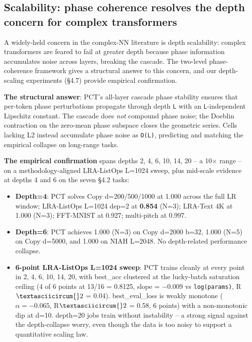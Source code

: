 \documentclass[11pt,a4paper]{article}
\theoremstyle{plain}
\theoremstyle{definition}
\begin{document}
\subsection{Scalability: phase coherence resolves the depth concern for complex transformers}
A widely-held concern in the complex-NN literature is depth scalability: complex transformers are feared to fail at greater depth because phase information accumulates noise across layers, breaking the cascade. The two-level phase-coherence framework gives a structural answer to this concern, and our depth-scaling experiments (\S{}4.7) provide empirical confirmation.

\textbf{The structural answer}: PCT's all-layer cascade phase stability ensures that per-token phase perturbations propagate through depth \texttt{L} with an \texttt{L}-independent Lipschitz constant. The cascade does \emph{not} compound phase noise; the Doeblin contraction on the zero-mean phase subspace closes the geometric series. Cells lacking L2 instead accumulate phase noise as \texttt{O(L)}, predicting and matching the empirical collapse on long-range tasks.

\textbf{The empirical confirmation} spans depths 2, 4, 6, 10, 14, 20 -- a 10$\times$ range -- on a methodology-aligned LRA-ListOps L=1024 sweep, plus mid-scale evidence at depths 4 and 6 on the seven \S{}4.2 tasks:

\begin{itemize}
  \item \textbf{Depth=4}: PCT solves Copy d=200/500/1000 at 1.000 across the full LR window; LRA-ListOps L=1024 dep=2 at \textbf{0.854} (N=3); LRA-Text 4K at 1.000 (N=3); FFT-MNIST at 0.927; multi-pitch at 0.997.
  \item \textbf{Depth=6}: PCT achieves 1.000 (N=3) on Copy d=2000 b=32, 1.000 (N=5) on Copy d=5000, and 1.000 on NIAH L=2048. No depth-related performance collapse.
  \item \textbf{6-point LRA-ListOps L=1024 sweep}: PCT trains cleanly at every point in {2, 4, 6, 10, 14, 20}, with best\_acc clustered at the lucky-batch saturation ceiling (4 of 6 points at 13/16 = 0.8125, slope = $-$0.009 vs \texttt{log(params)}, R$\textasciicircum{}2$ = 0.04). best\_eval\_loss is weakly monotone ($\alpha  = -0.065$, R$\textasciicircum{}2$ = 0.58, 6 points) with a non-monotonic dip at d=10. depth=20 jobs train without instability -- a strong signal against the depth-collapse worry, even though the data is too noisy to support a quantitative scaling law.
\end{itemize}
\end{document}
